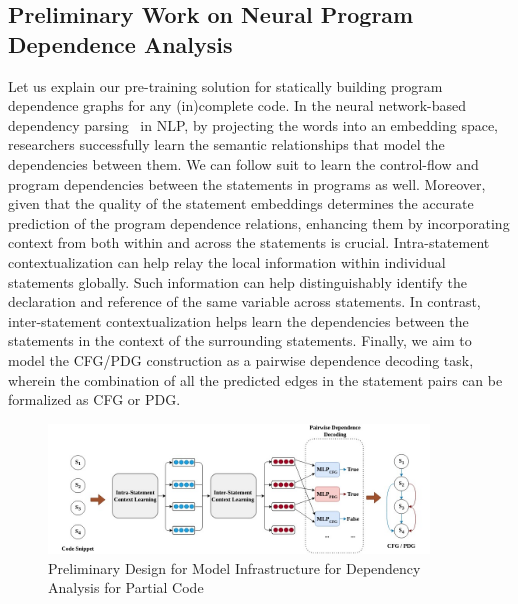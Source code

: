 \subsection{Preliminary Work on Neural Program Dependence Analysis}
\label{sec:deeppda}

Let us explain our pre-training solution for statically building
program dependence graphs for any (in)complete code. In the neural
network-based dependency parsing~\cite{chen-manning-2014-fast} in NLP,
by projecting the words into an embedding space, researchers
successfully learn the semantic relationships that model the
dependencies between them. We can follow suit to learn the
control-flow and program dependencies between the statements in
programs as well. Moreover, given that the quality of the statement
embeddings determines the accurate prediction of the program
dependence relations, enhancing them by incorporating context from
both within and across the statements is crucial. Intra-statement
contextualization can help relay the local information within
individual statements globally. Such information can help
distinguishably identify the declaration and reference of the same
variable across statements. In contrast, inter-statement
contextualization helps learn the dependencies between the statements
in the context of the surrounding statements. Finally, we aim to model
the CFG/PDG construction as a pairwise dependence decoding task,
wherein the combination of all the predicted edges in the statement
pairs can be formalized as CFG or PDG.

\begin{figure}[t]
\begin{center}
    \includegraphics[width=0.9\textwidth]{model-abstract.jpg}
    \caption{Preliminary Design for \tool Model Infrastructure for Dependency Analysis for Partial Code}
    \label{fig:model}
    \vspace{-26pt}
\end{center}
\end{figure}


